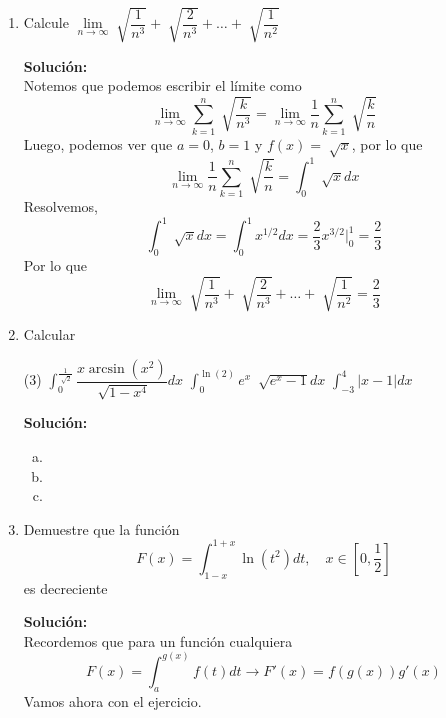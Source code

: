 \documentclass[12pt]{article}
\newenvironment{solucion}
{\begin{mdframed}[backgroundcolor=black!10]
		{\bf Solución:}\\
	}
	{
	\end{mdframed}
}
\newenvironment{preguntas}
{\begin{enumerate}\itemsep12pt
	}
	{
	\end{enumerate}
}
\newcommand{\ev}{\Big|}
\newcommand{\ra}{\rightarrow}
\begin{document}
\begin{preguntas}
\item Calcule $\lim\limits_{n \ra \infty} \sqrt[]{\dfrac{1}{n^3}} + \sqrt[]{\dfrac{2}{n^3}} + \dots  + \sqrt[]{\dfrac{1}{n^2}}$
\begin{solucion}
Notemos que podemos escribir el límite como
$$\lim\limits_{n \ra \infty} \sum\limits_{k=1}^{n}\sqrt[]{\dfrac{k}{n^3}} =
\lim\limits_{n \ra \infty} \dfrac{1}{n} \sum\limits_{k=1}^{n}\sqrt[]{\dfrac{k}{n}}$$
Luego, podemos ver que $a=0$, $b=1$ y $f(x) = \sqrt[]{x}$, por lo que
$$
\lim\limits_{n \ra \infty} \dfrac{1}{n} \sum\limits_{k=1}^{n}\sqrt[]{\dfrac{k}{n}} = \displaystyle\int_0^1\sqrt[]{x}dx$$
Resolvemos,
$$\displaystyle\int_0^1\sqrt[]{x}dx = 
\displaystyle\int_0^1 x^{1/2}dx =
\dfrac{2}{3}x^{3/2} \ev_0^1 =
\dfrac{2}{3}
$$
Por lo que
$$\lim\limits_{n \ra \infty} \sqrt[]{\dfrac{1}{n^3}} + \sqrt[]{\dfrac{2}{n^3}} + \dots  + \sqrt[]{\dfrac{1}{n^2}} = \dfrac{2}{3}$$
\end{solucion}
\item Calcular
\begin{tasks}(3)
\task $\displaystyle\int_0^{\frac{1}{\sqrt[]{2}}} \dfrac{x \arcsin(x^2)}{\sqrt[]{1-x^4}}dx$
\task $\displaystyle\int_0^{\ln(2)} e^x\ \sqrt[]{e^x-1}dx$
\task $\displaystyle\int_{-3}^{4} |x-1|dx$
\end{tasks}
\begin{solucion}

\begin{enumerate}[a)]
\item 
\item 
\item 
\end{enumerate}
\end{solucion}
\item Demuestre que la función
$$F(x) = \displaystyle\int_{1-x}^{1+x} \ln(t^2)dt, \quad x \in [0, \frac{1}{2}]$$
es decreciente
\begin{solucion}
Recordemos que para un función cualquiera
$$F(x) = \displaystyle\int_a^{g(x)}f(t)dt \ra F'(x) = f(g(x))g'(x)$$
Vamos ahora con el ejercicio.\\


\end{solucion}
\end{preguntas}
\end{document}
